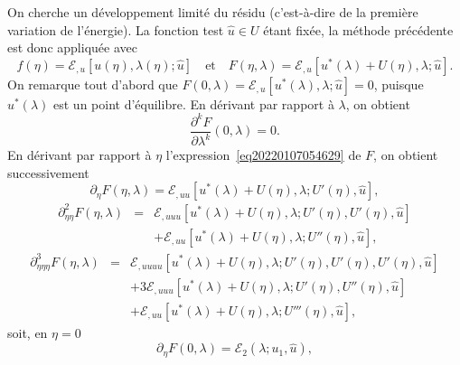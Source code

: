 \documentclass{article}
\newcommand{\nocomma}{}
\newcommand{\nosymbol}{}
\begin{document}
On cherche un d{\'e}veloppement limit{\'e} du r{\'e}sidu (c'est-{\`a}-dire de
la premi{\`e}re variation de l'{\'e}nergie). La fonction test $\hat{u} \in U$
{\'e}tant fix{\'e}e, la m{\'e}thode pr{\'e}c{\'e}dente est donc appliqu{\'e}e
avec
\begin{equation}
  \label{eq20220107054629} f (\eta) =\mathcal{E}_{, u} [u (\eta), \lambda
  (\eta) ; \hat{u}] \quad \text{et} \quad F (\eta, \lambda) =\mathcal{E}_{, u}
  [u^{\ast} (\lambda) + U (\eta), \lambda ; \hat{u}] .
\end{equation}
On remarque tout d'abord que $F (0, \lambda) =\mathcal{E}_{, u} [u^{\ast}
(\lambda), \lambda ; \hat{u}] = 0$, puisque $u^{\ast} (\lambda)$ est un point
d'{\'e}quilibre. En d{\'e}rivant par rapport {\`a} $\lambda$, on obtient
\begin{equation}
  \label{eq20211112164240} \frac{\partial^k F}{\partial \lambda^k} (0,
  \lambda) = 0.
\end{equation}
En d{\'e}rivant par rapport {\`a} $\eta$ l'expression~\eqref{eq20220107054629}
de $F$, on obtient successivement
\begin{equation}
  \partial_{\eta} F (\eta, \lambda) =\mathcal{E}_{, u \nocomma u} [u^{\ast}
  (\lambda) + U (\eta), \lambda ; U' (\eta), \hat{u}],
\end{equation}
\begin{eqnarray}
  \partial_{\eta \nocomma \eta}^2 F (\eta, \lambda) & = & \mathcal{E}_{, u
  \nocomma u \nocomma u} [u^{\ast} (\lambda) + U (\eta), \lambda ; U' (\eta),
  U' (\eta), \hat{u}] \nonumber\\
  &  & \nosymbol +\mathcal{E}_{, u \nocomma u} [u^{\ast} (\lambda) + U
  (\eta), \lambda ; U'' (\eta), \hat{u}], 
\end{eqnarray}
\begin{eqnarray}
  \partial_{\eta \nocomma \eta \nocomma \eta}^3 F (\eta, \lambda) & = &
  \mathcal{E}_{, u \nocomma u \nocomma u \nocomma u} [u^{\ast} (\lambda) + U
  (\eta), \lambda ; U' (\eta), U' (\eta), U' (\eta), \hat{u}] \nonumber\\
  &  & \nosymbol + 3\mathcal{E}_{, u \nocomma u \nocomma u} [u^{\ast}
  (\lambda) + U (\eta), \lambda ; U' (\eta), U'' (\eta), \hat{u}] \nonumber\\
  &  & \nosymbol +\mathcal{E}_{, u \nocomma u} [u^{\ast} (\lambda) + U
  (\eta), \lambda ; U''' (\eta), \hat{u}], 
\end{eqnarray}
soit, en $\eta = 0$
\begin{equation}
  \partial_{\eta} F (0, \lambda) =\mathcal{E}_2 (\lambda ; u_1, \hat{u}),
\end{equation}
\end{document}
